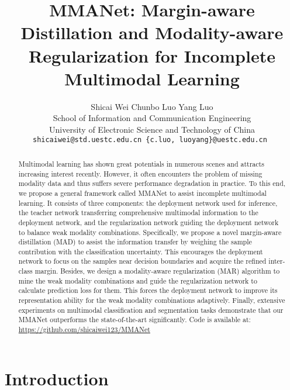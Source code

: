 \documentclass[10pt,twocolumn,letterpaper]{article}
\begin{document}
\title{MMANet: Margin-aware Distillation and Modality-aware Regularization for Incomplete Multimodal Learning}  

\author{Shicai Wei \quad\quad\quad  Chunbo Luo \quad\quad\quad  Yang Luo  \\
School of Information and Communication Engineering \\
University of Electronic Science and Technology of China\\
{\tt\small shicaiwei@std.uestc.edu.cn  \{c.luo, luoyang\}@uestc.edu.cn }
}
\maketitle

\begin{abstract}
Multimodal learning has shown great potentials in numerous scenes and attracts increasing interest recently. However, it often encounters the problem of missing modality data and thus suffers severe performance degradation in practice. To this end, we propose a general framework called MMANet to assist incomplete multimodal learning. It consists of three components: the deployment network used for inference, the teacher network transferring comprehensive multimodal information to the deployment network, and the regularization network guiding the deployment network to balance weak modality combinations. Specifically, we propose a novel margin-aware distillation (MAD) to assist the information transfer by weighing the sample contribution with the classification uncertainty. This encourages the deployment network to focus on the samples near decision boundaries and acquire the refined inter-class margin. Besides, we design a modality-aware regularization (MAR) algorithm to mine the weak modality combinations and guide the regularization network to calculate prediction loss for them. This forces the deployment network to improve its representation ability for the weak modality combinations adaptively. Finally, extensive experiments on multimodal classification and segmentation tasks demonstrate that our MMANet outperforms the state-of-the-art significantly. Code is available at: \href{https://github.com/shicaiwei123/MMANet}{https://github.com/shicaiwei123/MMANet}
\end{abstract}


\section{Introduction}
\label{Introduction}
\end{document}
